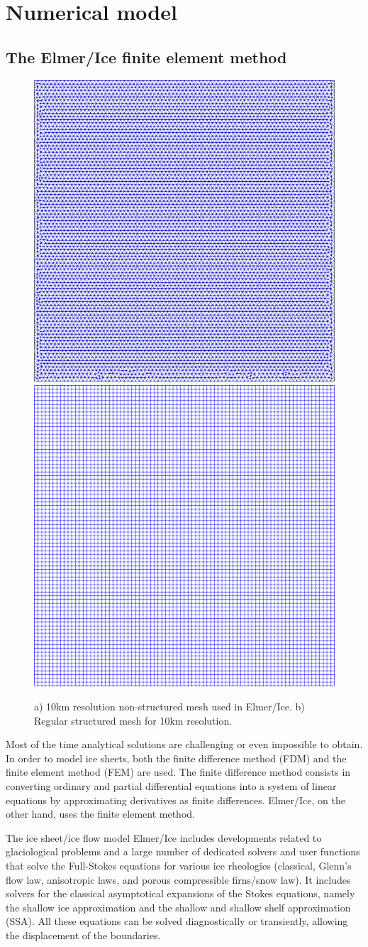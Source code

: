 \documentclass{article}
\begin{document}
\section{Numerical model}
\subsection{The Elmer/Ice finite element method}

\begin{figure}[!h]
	\centering
	\includegraphics[width=0.45\linewidth]{../fig/non_structured_grid_10km.png}
	\includegraphics[width=0.45\linewidth]{../fig/regular_grid_10km.png}
	\caption{a) 10km resolution non-structured mesh used in Elmer/Ice. b) Regular structured mesh for 10km resolution.}
	\label{meshes}
\end{figure}

Most of the time analytical solutions are challenging or even impossible to obtain. In order to model ice sheets, both the finite difference method (FDM) and the finite element method (FEM) are used. The finite difference method consists in converting ordinary and partial differential equations into a system of linear equations by approximating derivatives as finite differences. Elmer/Ice, on the other hand, uses the finite element method.

The ice sheet/ice flow model Elmer/Ice includes developments related to glaciological problems and a large number of dedicated solvers and user functions that solve the Full-Stokes equations for various ice rheologies (classical, Glenn's flow law, anisotropic laws, and porous compressible firns/snow law). It includes solvers for the classical asymptotical expansions of the Stokes equations, namely the shallow ice approximation and the shallow and shallow shelf approximation (SSA). All these equations can be solved diagnostically or transiently, allowing the displacement of the boundaries.
\end{document}
